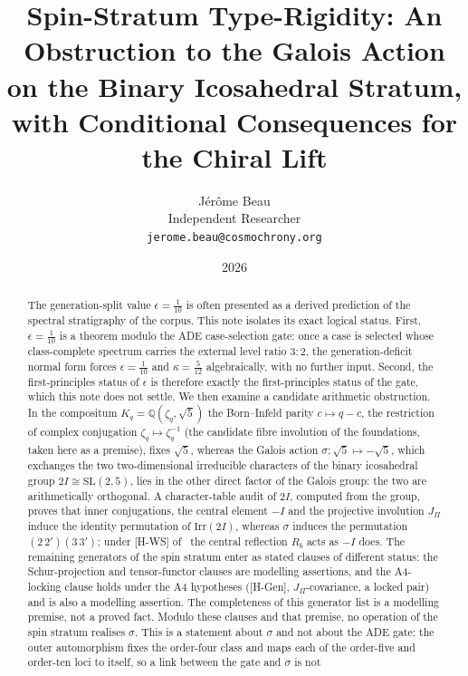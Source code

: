 \documentclass[11pt]{article}
\title{Spin-Stratum Type-Rigidity: An Obstruction to the Galois Action on the Binary Icosahedral Stratum, with Conditional Consequences for the Chiral Lift}
\author{J\'{e}r\^{o}me Beau\\[0.3em]
\small Independent Researcher\\
\small \texttt{jerome.beau@cosmochrony.org}}
\date{2026}
\theoremstyle{definition}
\theoremstyle{remark}
\begin{document}
  \maketitle

  \begin{abstract}
    The generation-split value $\epsilon=\tfrac{1}{10}$ is often presented as a derived prediction of the spectral
    stratigraphy of the corpus.
    This note isolates its exact logical status.
    First, $\epsilon=\tfrac{1}{10}$ is a theorem modulo the ADE case-selection gate: once a case is selected whose
    class-complete spectrum carries the external level ratio $3:2$, the generation-deficit normal form forces
    $\epsilon=\tfrac{1}{10}$ and $\kappa=\tfrac{5}{12}$ algebraically, with no further input.
    Second, the first-principles status of $\epsilon$ is therefore exactly the first-principles status of the gate,
    which this note does not settle.
    We then examine a candidate arithmetic obstruction.
    In the compositum $K_q=\mathbb{Q}(\zeta_q,\sqrt{5})$ the Born--Infeld parity $c\mapsto q-c$, the restriction of
    complex conjugation $\zeta_q\mapsto\zeta_q^{-1}$ (the candidate fibre involution of the foundations, taken here as a
    premise), fixes $\sqrt{5}$, whereas the Galois action
    $\sigma:\sqrt{5}\mapsto-\sqrt{5}$, which exchanges the two two-dimensional irreducible characters of the binary
    icosahedral group $2I\cong\mathrm{SL}(2,5)$, lies in the other direct factor of the Galois group: the two are
    arithmetically orthogonal.
    A character-table audit of $2I$, computed from the group, proves that inner conjugations, the central element
    $-I$ and the projective involution $J_\Pi$ induce the identity permutation of $\mathrm{Irr}(2I)$, whereas
    $\sigma$ induces the permutation $(2\,2')(3\,3')$; under [H-WS] of~\cite{Beau2026q11of} the central reflection
    $R_b$ acts as $-I$ does.
    The remaining generators of the spin stratum enter as stated clauses of different status: the Schur-projection and
    tensor-functor clauses are modelling assertions, and the A4-locking clause holds under the A4 hypotheses
    ([H-Gen], $J_\Pi$-covariance, a locked pair) and is also a modelling assertion.
    The completeness of this generator list is a modelling premise, not a proved fact.
    Modulo these clauses and that premise, no operation of the spin stratum realises $\sigma$.
    This is a statement about $\sigma$ and not about the ADE gate: the outer automorphism fixes the order-four class
    and maps each of the order-five and order-ten loci to itself, so a link between the gate and $\sigma$ is not

\end{abstract}
\end{document}
